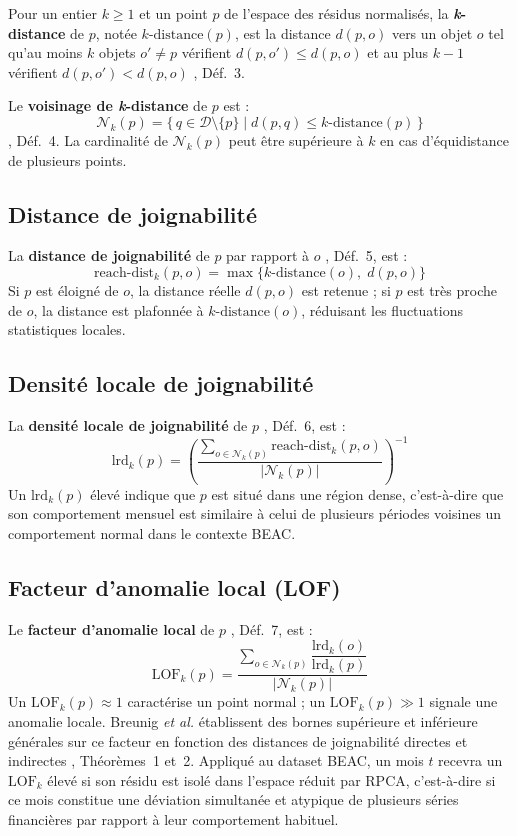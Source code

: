 \documentclass[12pt, a4paper]{article}
\begin{document}
Pour un entier $k \geq 1$ et un point $p$ de l'espace des résidus normalisés,
la \textbf{\textit{k}-distance} de $p$, notée $k\text{-distance}(p)$, est
la distance $d(p, o)$ vers un objet $o$ tel qu'au moins $k$ objets
$o' \neq p$ vérifient $d(p, o') \leq d(p, o)$ et au plus $k-1$ vérifient
$d(p, o') < d(p, o)$ \cite{breunig2000lof}, Déf.~3.

Le \textbf{voisinage de \textit{k}-distance} de $p$ est :
\[
    \mathcal{N}_k(p) = \bigl\{\, q \in \mathcal{D} \setminus \{p\}
    \mid d(p, q) \leq k\text{-distance}(p) \,\bigr\}
\]
\cite{breunig2000lof}, Déf.~4. La cardinalité de $\mathcal{N}_k(p)$ peut
être supérieure à $k$ en cas d'équidistance de plusieurs points.

\subsection{Distance de joignabilité}
\label{subsec:reachability}

La \textbf{distance de joignabilité} de $p$ par rapport à $o$
\cite{breunig2000lof}, Déf.~5, est :
\[
    \text{reach-dist}_k(p, o) = \max \bigl\{
    k\text{-distance}(o),\; d(p, o)
    \bigr\}
\]
Si $p$ est éloigné de $o$, la distance réelle $d(p,o)$ est retenue ;
si $p$ est très proche de $o$, la distance est plafonnée à
$k\text{-distance}(o)$, réduisant les fluctuations statistiques locales.

\subsection{Densité locale de joignabilité}
\label{subsec:lrd}

La \textbf{densité locale de joignabilité} de $p$
\cite{breunig2000lof}, Déf.~6, est :
\[
    \text{lrd}_k(p) = \left(
    \frac{\displaystyle\sum_{o \in \mathcal{N}_k(p)}
    \text{reach-dist}_k(p, o)}
    {\left|\mathcal{N}_k(p)\right|}
    \right)^{-1}
\]
Un $\text{lrd}_k(p)$ élevé indique que $p$ est situé dans une région dense,
c'est-à-dire que son comportement mensuel est similaire à celui de plusieurs
périodes voisines  un comportement normal dans le contexte BEAC.

\subsection{Facteur d'anomalie local (LOF)}
\label{subsec:lof_def}

Le \textbf{facteur d'anomalie local} de $p$
\cite{breunig2000lof}, Déf.~7, est :
\[
    \text{LOF}_k(p) =
    \frac{\displaystyle\sum_{o \in \mathcal{N}_k(p)}
    \dfrac{\text{lrd}_k(o)}{\text{lrd}_k(p)}}
    {\left|\mathcal{N}_k(p)\right|}
\]
Un $\text{LOF}_k(p) \approx 1$ caractérise un point normal ; un
$\text{LOF}_k(p) \gg 1$ signale une anomalie locale. Breunig \textit{et al.}
établissent des bornes supérieure et inférieure générales sur ce facteur en
fonction des distances de joignabilité directes et indirectes
\cite{breunig2000lof}, Théorèmes~1 et~2. Appliqué au dataset BEAC, un mois
$t$ recevra un $\text{LOF}_k$ élevé si son résidu est isolé dans l'espace
réduit par RPCA, c'est-à-dire si ce mois constitue une déviation simultanée
et atypique de plusieurs séries financières par rapport à leur comportement
habituel.
\end{document}

